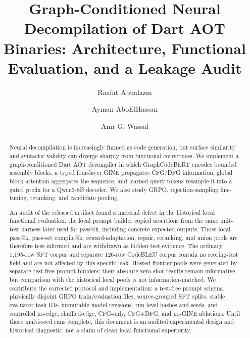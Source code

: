 \documentclass[11pt]{article}
\title{Graph-Conditioned Neural Decompilation of Dart AOT Binaries: Architecture, Functional Evaluation, and a Leakage Audit}
\author{Raafat Abualazm \and Ayman AboElHassan \and Amr G. Wassal}
\date{}
\begin{document}
\maketitle

\begin{abstract}
Neural decompilation is increasingly framed as code generation, but surface similarity and syntactic validity can diverge sharply from functional correctness. We implement a graph-conditioned Dart AOT decompiler in which GraphCodeBERT encodes bounded assembly blocks, a typed four-layer GINE propagates CFG/DFG information, global block attention aggregates the sequence, and learned query tokens resample it into a gated prefix for a Qwen3-8B decoder. We also study GRPO, rejection-sampling fine-tuning, reranking, and candidate pooling.

An audit of the released artifact found a material defect in the historical local functional evaluation: the local prompt builder copied assertions from the same unit-test harness later used for pass@k, including concrete expected outputs. Those local pass@k, pass-set compile@k, reward-adaptation, repair, reranking, and union pools are therefore test-informed and are withdrawn as hidden-test evidence. The ordinary 1,195-row SFT corpus and separate 126-row CodeBLEU corpus contain no scoring-test field and are not affected by this specific leak. Hosted frontier pools were generated by separate test-free prompt builders; their absolute zero-shot results remain informative, but comparison with the historical local pools is not information-matched. We contribute the corrected protocol and implementation: a test-free prompt schema, physically disjoint GRPO train/evaluation files, source-grouped SFT splits, stable evaluator task IDs, immutable model revisions, run-level hashes and seeds, and controlled no-edge, shuffled-edge, CFG-only, CFG+DFG, and no-GINE ablations. Until those multi-seed runs complete, this document is an audited experimental design and historical diagnostic, not a claim of clean local functional superiority.
\end{abstract}

\begin{center}
\end{center}
\end{document}
